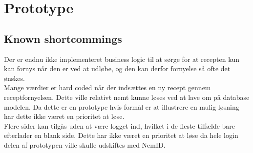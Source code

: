 \section{Prototype}




\newpage
\subsection{Known shortcommings}
Der er endnu ikke implementeret business logic til at sørge for at recepten kun kan fornys når den er ved at udløbe, og den kan derfor fornyelse så ofte det ønskes.\\
Mange værdier er hard coded når der indsættes en ny recept gennem receptfornyelsen. Dette ville relativt nemt kunne løses ved at lave om på database modelen. Da dette er en prototype hvis formål er at illustrere en mulig løsning har dette ikke været en prioritet at løse.\\
Flere sider kan tilgås uden at være logget ind, hvilket i de fleste tilfælde bare efterlader en blank side. Dette har ikke været en prioritet at løse da hele login delen af prototypen ville skulle udskiftes med NemID.